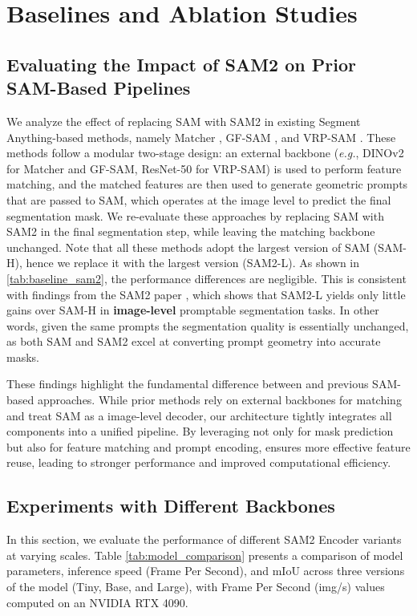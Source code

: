 \section{Baselines and Ablation Studies}
\label{sec:supp_backbone}
\subsection{Evaluating the Impact of SAM2 on Prior SAM-Based Pipelines}

We analyze the effect of replacing SAM with SAM2 in existing Segment Anything-based methods, namely Matcher \cite{liu2023matcher}, GF-SAM \cite{zhang2024bridge}, and VRP-SAM \cite{sun2024vrp}. These methods follow a modular two-stage design: an external backbone (\textit{e.g.}, DINOv2 for Matcher and GF-SAM, ResNet-50 for VRP-SAM) is used to perform feature matching, and the matched features are then used to generate geometric prompts that are passed to SAM, which operates at the image level to predict the final segmentation mask.
We re-evaluate these approaches by replacing SAM with SAM2 in the final segmentation step, while leaving the matching backbone unchanged. Note that all these methods adopt the largest version of SAM (SAM-H), hence we replace it with the largest \sam{} version (SAM2-L).  As shown in \cref{tab:baseline_sam2}, the performance differences are negligible.  This is consistent with findings from the SAM2 paper \cite{ravi2024sam}, which shows that SAM2-L yields only little gains over SAM-H in \textbf{image-level} promptable segmentation tasks. In other words, given the same prompts the segmentation quality is essentially unchanged, as both SAM and SAM2 excel at converting prompt geometry into accurate masks.



These findings highlight the fundamental difference between \ours{} and previous SAM-based approaches. While prior methods rely on external backbones for matching and treat SAM as a image-level decoder, our architecture tightly integrates all components into a unified pipeline. By leveraging \sam{} not only for mask prediction but also for feature matching and prompt encoding, \ours{} ensures more effective feature reuse, leading to stronger performance and improved computational efficiency.

\subsection{Experiments with Different Backbones}
In this section, we evaluate the performance of different SAM2 Encoder variants at varying scales. Table \ref{tab:model_comparison} presents a comparison of model parameters, inference speed (Frame Per Second), and mIoU across three versions of the model (Tiny, Base, and Large), with Frame Per Second (img/s) values computed on an NVIDIA RTX 4090. 

